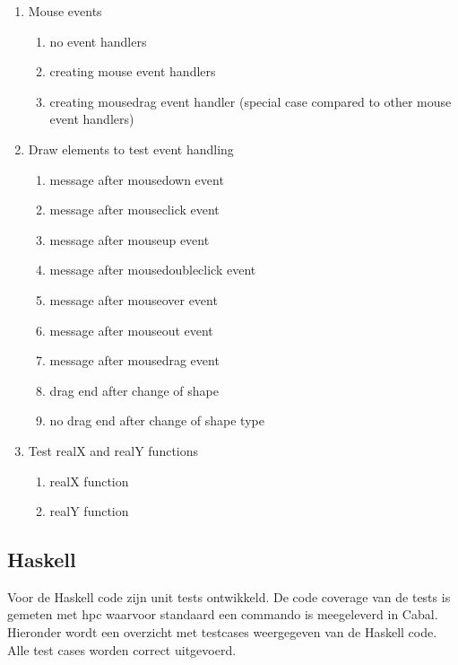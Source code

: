 \begin{enumerate}[label={T\arabic*}]
	\item Mouse events
	\begin{enumerate}[label={T\arabic{enumi}.\arabic*}]
		\item \label{test:js:mouse:no} no event handlers
		\item \label{test:js:mouse:create} creating mouse event handlers
		\item \label{test:js:mouse:drag} creating mousedrag event handler (special case compared to other mouse event handlers)
	\end{enumerate}
	\item Draw elements to test event handling
	\begin{enumerate}[label={T\arabic{enumi}.\arabic*}]
		\item \label{test:js:draw:mousedown} message after mousedown event
		\item \label{test:js:draw:mouseclick} message after mouseclick event
		\item \label{test:js:draw:mouseup} message after mouseup event
		\item \label{test:js:draw:mousedoubleclick} message after mousedoubleclick event
		\item \label{test:js:draw:mouseover} message after mouseover event
		\item \label{test:js:draw:mouseout} message after mouseout event
		\item \label{test:js:draw:mousedrag} message after mousedrag event
		\item \label{test:js:draw:mousedragend} drag end after change of shape
		\item \label{test:js:draw:mousenodragend} no drag end after change of shape type
	\end{enumerate}
	\item Test realX and realY functions
	\begin{enumerate}[label={T\arabic{enumi}.\arabic*}]
		\item \label{test:js:func:realX} realX function
		\item \label{test:js:func:realY} realY function
	\end{enumerate}
	\setcounter{startvaluetest}{\value{enumi}}
\end{enumerate}

\subsection{Haskell}
Voor de Haskell code zijn unit tests ontwikkeld. De code coverage van de tests is gemeten met hpc waarvoor standaard een commando is meegeleverd in Cabal. Hieronder wordt een overzicht met testcases weergegeven van de Haskell code. Alle test cases worden correct uitgevoerd.


